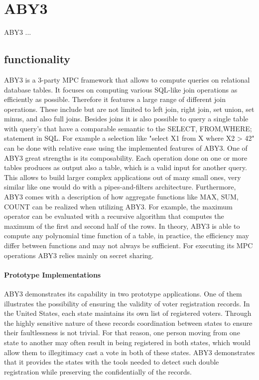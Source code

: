 \section{ABY3}
ABY3 \cite{aby3} ...
\subsection{functionality }
ABY3 is a 3-party MPC framework that allows to compute queries on relational database tables. It focuses on computing various SQL-like join operations as efficiently as possible. Therefore it features a large range of different join operations. These include but are not limited to left join, right join, set union, set minus, and also full joins.  
Besides joins it is also possible to query a single table with query's that have a comparable semantic to the SELECT, FROM,WHERE; statement in SQL. For example a selection like "select X1 from X  where X2 > 42" can be done with relative ease using the implemented features of ABY3. One of ABY3 great strengths is its composability.
Each operation done on one or more tables produces as output also a table, which is a valid input for another query. This allows to build larger complex applications out of many small ones, very similar like one would do with a pipes-and-filters architecture. 
Furthermore, ABY3 comes with a description of how aggregate functions like MAX, SUM, COUNT can be realized when utilizing ABY3. For example, the maximum operator can be evaluated with a recursive algorithm that computes the maximum of the first and second half of the rows. In theory, ABY3 is able to compute any polynomial time function of a table, in practice, the efficiency may differ between functions and may not always be sufficient.   For executing its MPC operations ABY3 relies mainly on secret sharing.


\paragraph{Prototype Implementations}
ABY3 demonstrates its capability in two prototype applications. One of them illustrates the possibility of ensuring the validity of voter registration records. In the United States, each state maintains its own list of registered voters. Through the highly sensitive nature of these records coordination between states to ensure their faultlessness is not trivial. For that reason, one person moving from one state to another may often result in being registered in both states, which would allow them to illegitimacy cast a vote in both of these states.
ABY3 demonstrates that it provides the states with  the tools needed to detect such double registration while preserving the confidentially of the records. 




